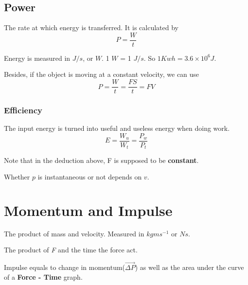 \documentclass[11pt, a4paper,oneside]{book}
\begin{document}
\subsection{Power}

\begin{definition}[Power]
    The rate at which energy is transferred. It is calculated by
\[
    P = \frac{W}{t}
\]
\end{definition}

Energy is measured in $ J / s $, or $ W $. 1 $ W $ = 1 $ J / s $. So $ 1Kwh = 3.6 \times 10^{6} J $.\par
Besides, if the object is moving at a constant velocity, we can use
\[
    P = \frac{W}{t} = \frac{FS}{t} = FV
\]

\subsubsection{Efficiency}
The input energy is turned into useful and useless energy when doing work.
\[
    E = \frac{W_u}{W_{t}} = \frac{P_w}{P_t}
\]\par
Note that in the deduction above, F is supposed to be \textbf{constant}.\par
Whether $ p $ is instantaneous or not depends on $ v $.
\section{Momentum and Impulse}
\begin{definition}[Momentum]
    The product of mass and velocity. Measured in $ kgms^{-1} $ or $ Ns $.
\end{definition}
\begin{definition}[Impulse]
    The product of \textit{F} and the time the force act.	
\end{definition}\par
Impulse equals to change in momentum($ \overrightarrow{\Delta P} $) as well as the area under the curve of a \textbf{Force - Time} graph.
\end{document}
